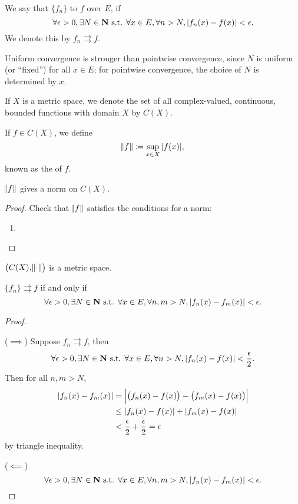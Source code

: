 \begin{definition}
We say that $\{f_n\}$  to $f$ over $E$, if 
\[\forall\epsilon>0, \exists N\in\mathbf N\text{ s.t. } \forall x\in E,\forall n>N,|f_n(x)-f(x)|<\epsilon.\]
We denote this by $f_n\rightrightarrows f$.
\end{definition}

Uniform convergence is stronger than pointwise convergence, since $N$ is uniform (or ``fixed'') for all $x\in E$; for pointwise convergence, the choice of $N$ is determined by $x$.

\begin{definition}
If $X$ is a metric space, we denote the set of all complex-valued, continuous, bounded functions with domain $X$ by $C(X)$.

If $f\in C(X)$, we define 
\[\norm{f}\coloneqq\sup_{x\in X}|f(x)|,\]
known as the  of $f$.
\end{definition}

\begin{lemma}
$\norm{f}$ gives a norm on $C(X)$.
\end{lemma}

\begin{proof}
Check that $\norm{f}$ satisfies the conditions for a norm:
\begin{enumerate}[label=(\arabic*)]
\item 
\end{enumerate}
\end{proof}

\begin{proposition}
$\left(C(X),\norm{\cdot}\right)$ is a metric space.
\end{proposition}

\begin{lemma}
$\{f_n\}\rightrightarrows f$ if and only if
\[\forall\epsilon>0,\exists N\in\mathbf N\text{ s.t. }\forall x\in E,\forall n,m>N,|f_n(x)-f_m(x)|<\epsilon.\]
\end{lemma}

\begin{proof} \

($\implies$) Suppose $f_n\rightrightarrows f$, then
\[\forall\epsilon>0, \exists N\in\mathbf N\text{ s.t. } \forall x\in E,\forall n>N,|f_n(x)-f(x)|<\frac{\epsilon}{2}.\]
Then for all $n,m>N$,
\begin{align*}
|f_n(x)-f_m(x)|
&=\left|\left(f_n(x)-f(x)\right)-\left(f_m(x)-f(x)\right)\right|\\
&\le|f_n(x)-f(x)|+|f_m(x)-f(x)|\\
&<\frac{\epsilon}{2}+\frac{\epsilon}{2}=\epsilon
\end{align*}
by triangle inequality.

($\impliedby$) 
\[\forall\epsilon>0,\exists N\in\mathbf N\text{ s.t. }\forall x\in E,\forall n,m>N,|f_n(x)-f_m(x)|<\epsilon.\]

\end{proof}

